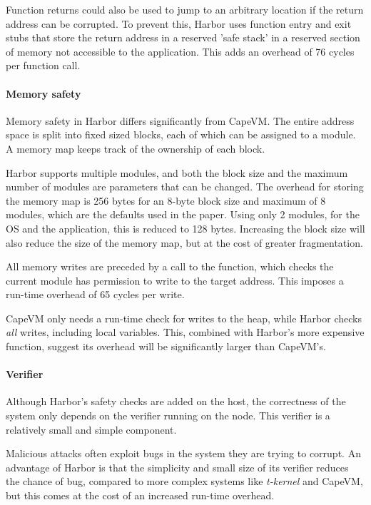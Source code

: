 Function returns could also be used to jump to an arbitrary location if the return address can be corrupted. To prevent this, Harbor uses function entry and exit stubs that store the return address in a reserved 'safe stack' in a reserved section of memory not accessible to the application. This adds an overhead of 76 cycles per function call.

\paragraph{Memory safety}
Memory safety in Harbor differs significantly from CapeVM. The entire address space is split into fixed sized blocks, each of which can be assigned to a module. A memory map keeps track of the ownership of each block.

Harbor supports multiple modules, and both the block size and the maximum number of modules are parameters that can be changed. The overhead for storing the memory map is 256 bytes for an 8-byte block size and maximum of 8 modules, which are the defaults used in the paper. Using only 2 modules, for the OS and the application, this is reduced to 128 bytes. Increasing the block size will also reduce the size of the memory map, but at the cost of greater fragmentation.

All memory writes are preceded by a call to the  function, which checks the current module has permission to write to the target address. This imposes a run-time overhead of 65 cycles per write.

CapeVM only needs a run-time check for writes to the heap, while Harbor checks \emph{all} writes, including local variables. This, combined with Harbor's more expensive  function, suggest its overhead will be significantly larger than CapeVM's.

\paragraph{Verifier}
Although Harbor's safety checks are added on the host, the correctness of the system only depends on the verifier running on the node. This verifier is a relatively small and simple component.

Malicious attacks often exploit bugs in the system they are trying to corrupt. An advantage of Harbor is that the simplicity and small size of its verifier reduces the chance of bug, compared to more complex systems like \emph{t-kernel} and CapeVM, but this comes at the cost of an increased run-time overhead.

